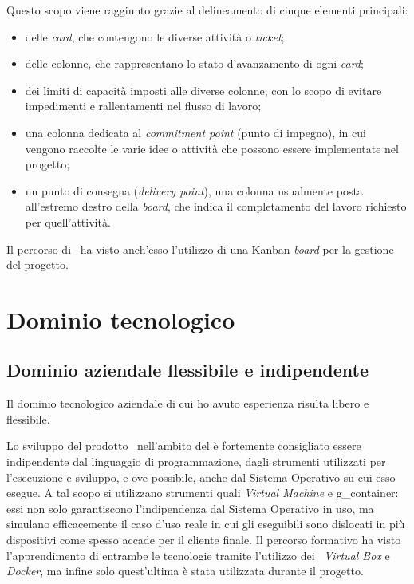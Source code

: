 \noindent
Questo scopo viene raggiunto grazie al delineamento di cinque elementi principali:
\begin{itemize}
  \item delle \textit{card}, che contengono le diverse attività o \textit{ticket};
  \item delle colonne, che rappresentano lo stato d'avanzamento di ogni \textit{card};
  \item dei limiti di capacità imposti alle diverse colonne, con lo scopo di evitare impedimenti e rallentamenti nel flusso di lavoro;
  \item una colonna dedicata al \textit{commitment point} (punto di impegno), in cui vengono raccolte le varie idee o attività che possono essere implementate nel progetto;
  \item un punto di consegna (\textit{delivery point}), una colonna usualmente posta all'estremo destro della \textit{board}, che indica il completamento del lavoro richiesto per quell'attività.
\end{itemize}

Il percorso di \stage\ ha visto anch'esso l'utilizzo di una Kanban \textit{board} per la gestione del progetto.
\section{Dominio tecnologico}

\subsection{Dominio aziendale flessibile e indipendente}

Il dominio tecnologico aziendale di cui ho avuto esperienza risulta libero e flessibile.

Lo sviluppo del prodotto \software\ nell'ambito del  è fortemente consigliato essere indipendente dal linguaggio di programmazione, dagli strumenti utilizzati per l'esecuzione e sviluppo, e ove possibile, anche dal Sistema Operativo su cui esso esegue.
A tal scopo si utilizzano strumenti quali \textit{Virtual Machine} e \gls{g_container}: essi non solo garantiscono l'indipendenza dal Sistema Operativo in uso, ma simulano efficacemente il caso d'uso reale in cui gli eseguibili sono dislocati in più dispositivi come spesso accade per il cliente finale.
Il percorso formativo ha visto l'apprendimento di entrambe le tecnologie tramite l'utilizzo dei \software\ \textit{Virtual Box} e \textit{Docker}, ma infine solo quest'ultima è stata utilizzata durante il progetto.

